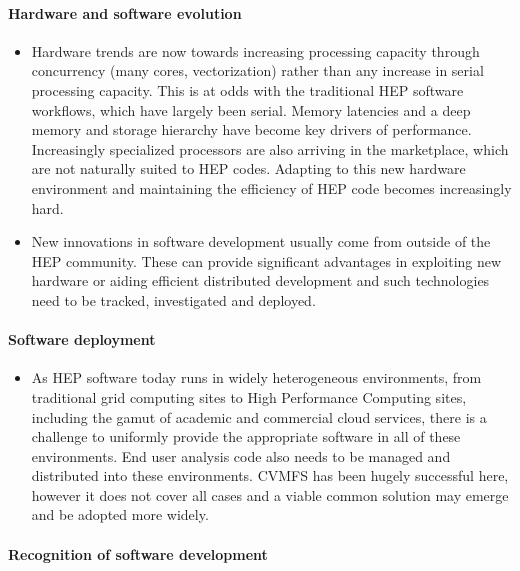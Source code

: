 \documentclass[12pt,a4paper]{article}
\begin{document}
\paragraph{Hardware and software evolution}

\begin{itemize}
\item
    Hardware trends are now towards increasing processing capacity through
  concurrency (many cores, vectorization) rather than any increase in
  serial processing capacity. This is at odds with the traditional HEP
  software workflows, which have largely been serial. Memory latencies
  and a deep memory and storage hierarchy have become key drivers of
  performance. Increasingly specialized processors are also arriving in
  the marketplace, which are not naturally suited to HEP codes. Adapting
  to this new hardware environment and maintaining the efficiency of HEP
  code becomes increasingly hard.
  \item
    New innovations in software development usually come from outside of
  the HEP community. These can provide significant advantages in
  exploiting new hardware or aiding efficient distributed development
  and such technologies need to be tracked, investigated and deployed.
  \end{itemize}

\paragraph{Software deployment}

\begin{itemize}
\item
    As HEP software today runs in widely heterogeneous environments, from
  traditional grid computing sites to High Performance Computing sites,
  including the gamut of academic and commercial cloud services, there
  is a challenge to uniformly provide the appropriate software in all of
  these environments. End user analysis code also needs to be managed
  and distributed into these environments. CVMFS has been hugely
  successful here, however it does not cover all cases and a viable
  common solution may emerge and be adopted more widely.
  \end{itemize}

\paragraph{Recognition of software development}
\end{document}
